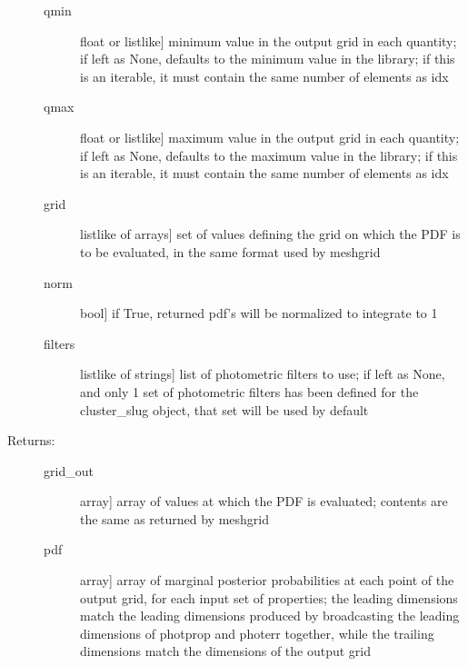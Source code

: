 \documentclass[letterpaper,10pt,english]{sphinxmanual}
\begin{document}
\begin{fulllineitems}
\begin{fulllineitems}
\begin{description}
\begin{description}
\item[{qmin}] \leavevmode{[}float or listlike{]}
minimum value in the output grid in each quantity; if
left as None, defaults to the minimum value in the
library; if this is an iterable, it must contain the
same number of elements as idx

\item[{qmax}] \leavevmode{[}float or listlike{]}
maximum value in the output grid in each quantity; if
left as None, defaults to the maximum value in the
library; if this is an iterable, it must contain the
same number of elements as idx

\item[{grid}] \leavevmode{[}listlike of arrays{]}
set of values defining the grid on which the PDF is to
be evaluated, in the same format used by meshgrid

\item[{norm}] \leavevmode{[}bool{]}
if True, returned pdf's will be normalized to integrate
to 1

\item[{filters}] \leavevmode{[}listlike of strings{]}
list of photometric filters to use; if left as None, and
only 1 set of photometric filters has been defined for
the cluster\_slug object, that set will be used by
default

\end{description}

\item[{Returns:}] \leavevmode\begin{description}
\item[{grid\_out}] \leavevmode{[}array{]}
array of values at which the PDF is evaluated; contents
are the same as returned by meshgrid

\item[{pdf}] \leavevmode{[}array{]}
array of marginal posterior probabilities at each point
of the output grid, for each input set of properties; the leading
dimensions match the leading dimensions produced by
broadcasting the leading dimensions of photprop and
photerr together, while the trailing dimensions match
the dimensions of the output grid

\end{description}

\end{description}

\end{fulllineitems}



\end{fulllineitems}
\end{document}
